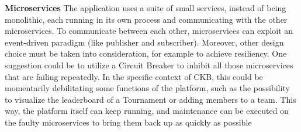 \textbf{Microservices}
The application uses a suite of small services, instead of being monolithic, 
each running in its own process and communicating with the other microservices. 
To communicate between each other, microservices can exploit an event-driven paradigm (like publisher and subscriber). 
Moreover, other design choice must be taken into consideration, for example to achieve resiliency. 
One suggestion could be to utilize a Circuit Breaker to inhibit all those microservices that are failing repeatedly. 
In the specific context of CKB, this could be momentarily debilitating some functions of the platform, 
such as the possibility to visualize the leaderboard of a Tournament or adding members to a team. 
This way, the platform itself can keep running, and maintenance can be executed on the faulty microservices to bring them back up as quickly as possible

